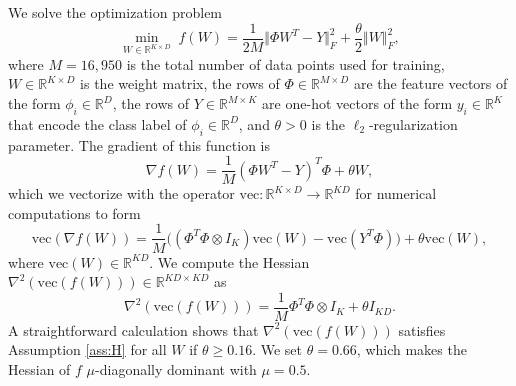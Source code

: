 \documentclass[9pt,shortpaper,twoside,web]{ieeecolor}
\newcommand{\R}{\ensuremath{\mathbb{R}}\xspace}
\newcommand{\blue}[1]{{\textcolor{blue}{#1}}}
\begin{document}
    We solve the optimization problem
    \begin{equation}\label{eq:newsgroupF}
        \min_{W\in\R^{K\times D}}\; f(W)=\frac{1}{2M}\Vert \Phi W^T- Y\Vert_{F}^2 + \frac{\theta}{2}\Vert W\Vert_F^2,
    \end{equation}
    where $M=16,950$ is the total number of data points
    used for training, 
    $W\in\R^{K\times D}$ is the weight matrix, the rows of $\Phi\in\R^{M\times D}$ are the feature vectors of the form $\phi_i\in\R^D$, the rows of $Y\in\R^{M\times K}$ are one-hot vectors of the form $y_i\in\R^K$ that encode the class label of $\phi_i\in\R^D$, 
    and $\theta>0$ is the $\ell_2$-regularization parameter. 
    The gradient of this function is
    \begin{equation}
        \nabla f(W)= \frac{1}{M}(\Phi W^T - Y)^T\Phi + \theta W,
    \end{equation}
    which we vectorize with the operator $\text{vec}:\R^{K\times D}\rightarrow \R^{KD}$ for numerical computations to form 
    \begin{equation}
        \text{vec}({\nabla f (W)}) = \frac{1}{M}\big((\Phi^T\Phi \otimes I_K)\text{vec}(W) -\text{vec}(Y^T\Phi)\big)+ \theta \text{vec}(W),
    \end{equation}
    where $\text{vec}(W)\in\R^{KD}$.
    We compute the Hessian $\nabla^2(\text{vec}(f(W)))\in\R^{KD\times KD}$ as
    \begin{equation}
        \nabla^2(\text{vec}(f(W))) = \frac{1}{M}\Phi^T\Phi\otimes I_K + \theta I_{KD}.
    \end{equation}
    A straightforward calculation shows that $\nabla^2(\text{vec}(f(W)))$ satisfies Assumption \ref{ass:H} for all $W$ if $\theta\geq 0.16$.
    We set $\theta=0.66$, which makes
    the Hessian of $f$ $\mu$-diagonally dominant with $\mu=0.5$.
\end{document}

